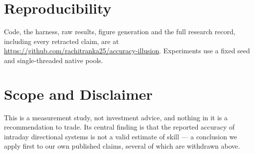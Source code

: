 \documentclass[conference]{IEEEtran}
\begin{document}
\section*{Reproducibility}

Code, the harness, raw results, figure generation and the full research record,
including every retracted claim, are at
\url{https://github.com/rachitranka25/accuracy-illusion}. Experiments use a
fixed seed and single-threaded native pools.

\section*{Scope and Disclaimer}

This is a measurement study, not investment advice, and nothing in it is a
recommendation to trade. Its central finding is that the reported accuracy of
intraday directional systems is not a valid estimate of skill --- a conclusion
we apply first to our own published claims, several of which are withdrawn
above.

\balance
\end{document}
